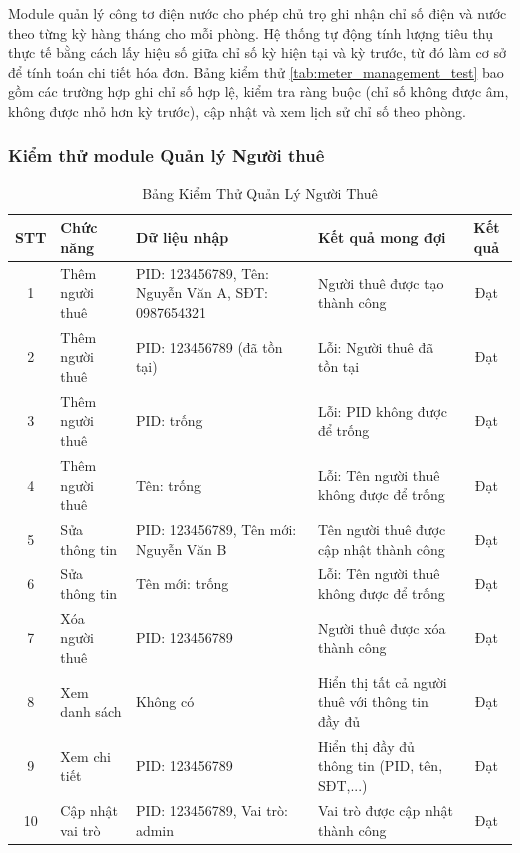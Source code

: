 Module quản lý công tơ điện nước cho phép chủ trọ ghi nhận chỉ số điện và nước theo từng kỳ hàng tháng cho mỗi phòng. Hệ thống tự động tính lượng tiêu thụ thực tế bằng cách lấy hiệu số giữa chỉ số kỳ hiện tại và kỳ trước, từ đó làm cơ sở để tính toán chi tiết hóa đơn. Bảng kiểm thử \ref{tab:meter_management_test} bao gồm các trường hợp ghi chỉ số hợp lệ, kiểm tra ràng buộc (chỉ số không được âm, không được nhỏ hơn kỳ trước), cập nhật và xem lịch sử chỉ số theo phòng.


\subsubsection{Kiểm thử module Quản lý Người thuê}

\begin{table}[H]
    \caption{Bảng Kiểm Thử Quản Lý Người Thuê}
    \label{tab:tenant_management_test}
    \vspace{2mm}
    \begin{small}
    \begin{tabularx}{\textwidth}{|c|l|X|X|c|}
    \hline
    \textbf{STT} & \textbf{Chức năng} & \textbf{Dữ liệu nhập} & \textbf{Kết quả mong đợi} & \textbf{Kết quả} \\ \hline
    1 & Thêm người thuê & PID: 123456789, Tên: Nguyễn Văn A, SĐT: 0987654321 & Người thuê được tạo thành công & Đạt \\ \hline
    2 & Thêm người thuê & PID: 123456789 (đã tồn tại) & Lỗi: Người thuê đã tồn tại & Đạt \\ \hline
    3 & Thêm người thuê & PID: trống & Lỗi: PID không được để trống & Đạt \\ \hline
    4 & Thêm người thuê & Tên: trống & Lỗi: Tên người thuê không được để trống & Đạt \\ \hline
    5 & Sửa thông tin & PID: 123456789, Tên mới: Nguyễn Văn B & Tên người thuê được cập nhật thành công & Đạt \\ \hline
    6 & Sửa thông tin & Tên mới: trống & Lỗi: Tên người thuê không được để trống & Đạt \\ \hline
    7 & Xóa người thuê & PID: 123456789 & Người thuê được xóa thành công & Đạt \\ \hline
    8 & Xem danh sách & Không có & Hiển thị tất cả người thuê với thông tin đầy đủ & Đạt \\ \hline
    9 & Xem chi tiết & PID: 123456789 & Hiển thị đầy đủ thông tin (PID, tên, SĐT,...) & Đạt \\ \hline
    10 & Cập nhật vai trò & PID: 123456789, Vai trò: admin & Vai trò được cập nhật thành công & Đạt \\ \hline
    \end{tabularx}
    \end{small}
\end{table}

